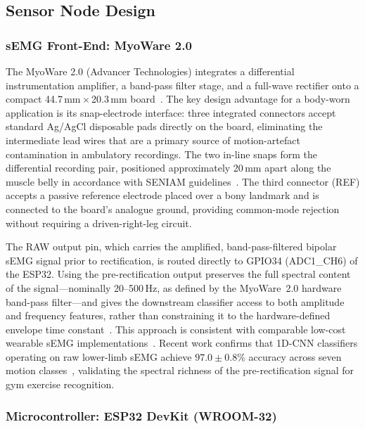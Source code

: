 \subsection{Sensor Node Design}

\subsubsection{sEMG Front-End: MyoWare 2.0}

The MyoWare 2.0 (Advancer Technologies) integrates a differential instrumentation amplifier, a band-pass filter stage, and a full-wave rectifier onto a compact 44.7\,mm\,$\times$\,20.3\,mm board~\cite{advancer_myoware2}. The key design advantage for a body-worn application is its snap-electrode interface: three integrated connectors accept standard Ag/AgCl disposable pads directly on the board, eliminating the intermediate lead wires that are a primary source of motion-artefact contamination in ambulatory recordings. The two in-line snaps form the differential recording pair, positioned approximately 20\,mm apart along the muscle belly in accordance with SENIAM guidelines~\cite{Hermens2000SENIAM}. The third connector (REF) accepts a passive reference electrode placed over a bony landmark and is connected to the board's analogue ground, providing common-mode rejection without requiring a driven-right-leg circuit.

The RAW output pin, which carries the amplified, band-pass-filtered bipolar sEMG signal prior to rectification, is routed directly to GPIO34 (ADC1\_CH6) of the ESP32. Using the pre-rectification output preserves the full spectral content of the signal---nominally 20--500\,Hz, as defined by the MyoWare~2.0 hardware band-pass filter---and gives the downstream classifier access to both amplitude and frequency features, rather than constraining it to the hardware-defined envelope time constant~\cite{phinyomark2018feature}. This approach is consistent with comparable low-cost wearable sEMG implementations~\cite{gomez2022wearable}. Recent work confirms that 1D-CNN classifiers operating on raw lower-limb sEMG achieve $97.0 \pm 0.8$\% accuracy across seven motion classes~\cite{mot_semg2025}, validating the spectral richness of the pre-rectification signal for gym exercise recognition.


\subsubsection{Microcontroller: ESP32 DevKit (WROOM-32)}

